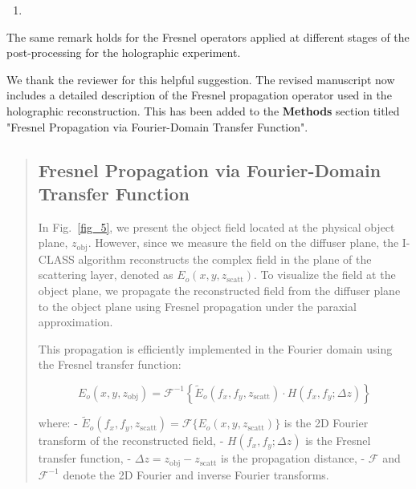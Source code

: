 \documentclass[12pt]{article}
\newenvironment{solved_reviewercomment}
    {\begin{tcolorbox}[width=\linewidth,colback=gray!5,colframe=solved_commentcolor!50,title=Reviewer Comment,left=5pt,right=5pt]}
    {\end{tcolorbox}}
\newenvironment{ourresponse}
    {\begin{tcolorbox}[width=\linewidth,breakable,enhanced,colback=gray!5,colframe=responsecolor!50,title=Response,left=5pt,right=5pt]}
    {\end{tcolorbox}}
\begin{document}
\begin{enumerate}[label=\arabic*., resume]
\item \leavevmode
\end{enumerate}
\vspace{-1em}
\begin{solved_reviewercomment}
    The same remark holds for the Fresnel operators applied at different stages of the post-processing for the holographic experiment.
\end{solved_reviewercomment}

\begin{ourresponse}
    We thank the reviewer for this helpful suggestion. The revised manuscript now includes a detailed description of the Fresnel propagation operator used in the holographic reconstruction. This has been added to the \textbf{Methods} section titled "Fresnel Propagation via Fourier-Domain Transfer Function".
    \begin{quote}
        \subsection*{Fresnel Propagation via Fourier-Domain Transfer Function}
        \label{Fresnel_propagation}
        In Fig.~\ref{fig_5}, we present the object field located at the physical object plane, $z_{\text{obj}}$. However, since we measure the field on the diffuser plane, the I-CLASS algorithm reconstructs the complex field in the plane of the scattering layer, denoted as $E_o(x, y, z_{\text{scatt}})$. To visualize the field at the object plane, we propagate the reconstructed field from the diffuser plane to the object plane using Fresnel propagation under the paraxial approximation.
        
        This propagation is efficiently implemented in the Fourier domain using the Fresnel transfer function:
        
        \begin{equation}
            E_o(x, y, z_{\text{obj}}) = \mathcal{F}^{-1} \left\{ \tilde{E}_o(f_x, f_y, z_{\text{scatt}}) \cdot H(f_x, f_y; \Delta z) \right\}
        \end{equation}
        
        where:
        - $ \tilde{E}_o(f_x, f_y, z_{\text{scatt}}) = \mathcal{F}\{ E_o(x, y, z_{\text{scatt}}) \} $ is the 2D Fourier transform of the reconstructed field,
        - $ H(f_x, f_y; \Delta z) $ is the Fresnel transfer function,
        - $ \Delta z = z_{\text{obj}} - z_{\text{scatt}} $ is the propagation distance,
        - $ \mathcal{F} $ and $ \mathcal{F}^{-1} $ denote the 2D Fourier and inverse Fourier transforms.
        

\end{quote}
\end{ourresponse}
\end{document}
